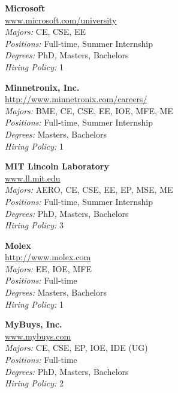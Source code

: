 \documentclass{article}
\begin{document}
\begin{center}
\begin{multicols}{3}
\begin{minipage}{.9\columnwidth}{\Large\bf Microsoft }\\
	\url{www.microsoft.com/university}\\
	\emph{Majors:} CE, CSE, EE\\
	\emph{Positions:} Full-time, Summer Internship\\
	\emph{Degrees:} PhD, Masters, Bachelors\\
	\emph{Hiring Policy:} 1\\
\end{minipage}
 
\begin{minipage}{.9\columnwidth}{\Large\bf Minnetronix, Inc. }\\
	\url{http://www.minnetronix.com/careers/}\\
	\emph{Majors:} BME, CE, CSE, EE, IOE, MFE, ME\\
	\emph{Positions:} Full-time, Summer Internship\\
	\emph{Degrees:} Masters, Bachelors\\
	\emph{Hiring Policy:} 1\\
\end{minipage}
 
\begin{minipage}{.9\columnwidth}{\Large\bf MIT Lincoln Laboratory }\\
	\url{www.ll.mit.edu}\\
	\emph{Majors:} AERO, CE, CSE, EE, EP, MSE, ME\\
	\emph{Positions:} Full-time, Summer Internship\\
	\emph{Degrees:} PhD, Masters, Bachelors\\
	\emph{Hiring Policy:} 3\\
\end{minipage}
 
\begin{minipage}{.9\columnwidth}{\Large\bf Molex }\\
	\url{http://www.molex.com}\\
	\emph{Majors:} EE, IOE, MFE\\
	\emph{Positions:} Full-time\\
	\emph{Degrees:} Masters, Bachelors\\
	\emph{Hiring Policy:} 1\\
\end{minipage}
 
\begin{minipage}{.9\columnwidth}{\Large\bf MyBuys, Inc. }\\
	\url{www.mybuys.com}\\
	\emph{Majors:} CE, CSE, EP, IOE, IDE (UG)\\
	\emph{Positions:} Full-time\\
	\emph{Degrees:} PhD, Masters, Bachelors\\
	\emph{Hiring Policy:} 2\\
\end{minipage}
 

\end{multicols}
\end{center}
\end{document}
